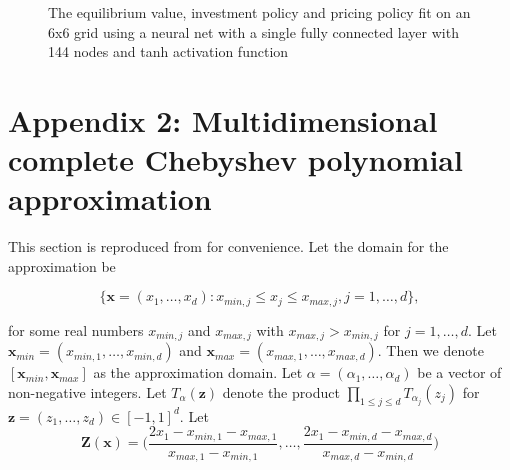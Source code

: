 \documentclass[12pt]{article}
\begin{document}
\begin{figure}[H]
  \centering
  \caption{The equilibrium value, investment policy and pricing policy fit on an 6x6 grid using a neural net with a single fully connected layer with 144 nodes and tanh activation function}
\end{figure}

\section*{Appendix 2: Multidimensional complete Chebyshev polynomial approximation}
\label{multicheb}

This section is reproduced from \citet{2015_Judd_Cai} for convenience. Let the domain for the approximation be

\begin{equation*}
  \{\boldsymbol{x}=(x_1,\dots,x_d):x_{min,j}\leq x_j \leq x_{max,j}, j=1,\dots,d \},
\end{equation*}

for some real numbers $x_{min,j}$ and $x_{max,j}$ with $x_{max,j} > x_{min,j}$ for $j=1,\dots,d$. Let $\boldsymbol{x}_{min}=(x_{min,1},\dots,x_{min,d})$ and $\boldsymbol{x}_{max}=(x_{max,1},\dots,x_{max,d})$. Then we denote $[\boldsymbol{x}_{min},\boldsymbol{x}_{max}]$ as the approximation domain. Let $\alpha=(\alpha_1,\dots,\alpha_d)$ be a vector of non-negative integers. Let $T_\alpha(\boldsymbol{z})$ denote the product $\prod_{1\leq j \leq d} T_{\alpha_j}(z_j)$ for $\boldsymbol{z}=(z_1,\dots,z_d) \in [-1,1]^d$. Let
\begin{equation*}
  \boldsymbol{Z}(\boldsymbol{x})=\bigg( \frac{2x_1-x_{min,1}-x_{max,1}}{x_{max,1}-x_{min,1}},\dots,\frac{2x_1-x_{min,d}-x_{max,d}}{x_{max,d}-x_{min,d}} \bigg)
\end{equation*}
\end{document}
